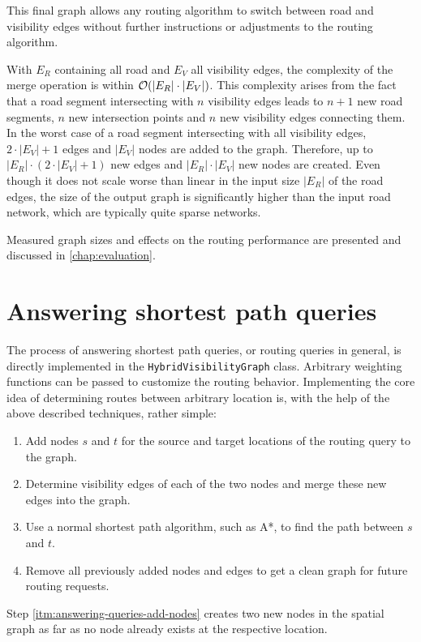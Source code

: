 		This final graph allows any routing algorithm to switch between road and visibility edges without further instructions or adjustments to the routing algorithm.
		

		With $E_R$ containing all road and $E_V$ all visibility edges, the complexity of the merge operation is within $\mathcal{O}(|E_R| \cdot |E_V|)$.
		This complexity arises from the fact that a road segment intersecting with $n$ visibility edges leads to $n+1$ new road segments, $n$ new intersection points and $n$ new visibility edges connecting them.
		In the worst case of a road segment intersecting with all visibility edges, $2 \cdot |E_V| + 1$ edges and $|E_V|$ nodes are added to the graph.
		Therefore, up to $|E_R| \cdot (2 \cdot |E_V| + 1)$ new edges and $|E_R| \cdot |E_V|$ new nodes are created.
		Even though it does not scale worse than linear in the input size $|E_R|$ of the road edges, the size of the output graph is significantly higher than the input road network, which are typically quite sparse networks.

		Measured graph sizes and effects on the routing performance are presented and discussed in \cref{chap:evaluation}.
	
\section{Answering shortest path queries}
\label{sec:answering-queries}

	The process of answering shortest path queries, or routing queries in general, is directly implemented in the \texttt{HybridVisibilityGraph} class.
	Arbitrary weighting functions can be passed to customize the routing behavior.
	Implementing the core idea of determining routes between arbitrary location is, with the help of the above described techniques, rather simple:
	\begin{enumerate}
		\item \label{itm:answering-queries-add-nodes} Add nodes $s$ and $t$ for the source and target locations of the routing query to the graph.
		\item \label{itm:answering-queries-vis-edges} Determine visibility edges of each of the two nodes and merge these new edges into the graph.
		\item \label{itm:answering-queries-routing} Use a normal shortest path algorithm, such as A*, to find the path between $s$ and $t$.
		\item \label{itm:answering-queries-cleanup} Remove all previously added nodes and edges to get a clean graph for future routing requests.
	\end{enumerate}
	Step \ref{itm:answering-queries-add-nodes} creates two new nodes in the spatial graph as far as no node already exists at the respective location.
	
